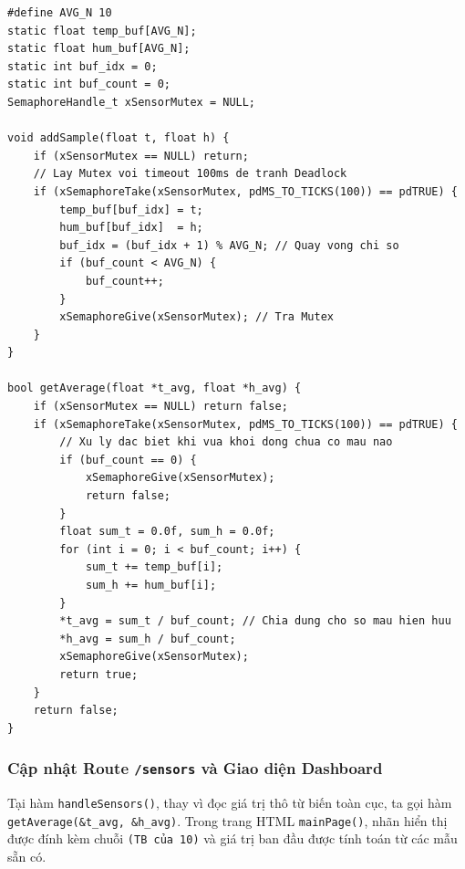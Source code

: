 \begin{lstlisting}[caption={Cơ chế thêm mẫu và tính toán trung bình trượt an toàn với Mutex}]
#define AVG_N 10
static float temp_buf[AVG_N];
static float hum_buf[AVG_N];
static int buf_idx = 0;
static int buf_count = 0;
SemaphoreHandle_t xSensorMutex = NULL;

void addSample(float t, float h) {
    if (xSensorMutex == NULL) return;
    // Lay Mutex voi timeout 100ms de tranh Deadlock
    if (xSemaphoreTake(xSensorMutex, pdMS_TO_TICKS(100)) == pdTRUE) {
        temp_buf[buf_idx] = t;
        hum_buf[buf_idx]  = h;
        buf_idx = (buf_idx + 1) % AVG_N; // Quay vong chi so
        if (buf_count < AVG_N) {
            buf_count++;
        }
        xSemaphoreGive(xSensorMutex); // Tra Mutex
    }
}

bool getAverage(float *t_avg, float *h_avg) {
    if (xSensorMutex == NULL) return false;
    if (xSemaphoreTake(xSensorMutex, pdMS_TO_TICKS(100)) == pdTRUE) {
        // Xu ly dac biet khi vua khoi dong chua co mau nao
        if (buf_count == 0) {
            xSemaphoreGive(xSensorMutex);
            return false;
        }
        float sum_t = 0.0f, sum_h = 0.0f;
        for (int i = 0; i < buf_count; i++) {
            sum_t += temp_buf[i];
            sum_h += hum_buf[i];
        }
        *t_avg = sum_t / buf_count; // Chia dung cho so mau hien huu
        *h_avg = sum_h / buf_count;
        xSemaphoreGive(xSensorMutex);
        return true;
    }
    return false;
}
\end{lstlisting}

\subsubsection{Cập nhật Route \texttt{/sensors} và Giao diện Dashboard}
Tại hàm \texttt{handleSensors()}, thay vì đọc giá trị thô từ biến toàn cục, ta gọi hàm \texttt{getAverage(\&t\_avg, \&h\_avg)}. Trong trang HTML \texttt{mainPage()}, nhãn hiển thị được đính kèm chuỗi \texttt{(TB của 10)} và giá trị ban đầu được tính toán từ các mẫu sẵn có.


